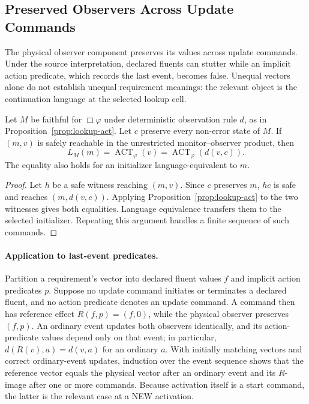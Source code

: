 \subsection{Preserved Observers Across Update Commands}
\label{ta:command-observation}
The physical observer component preserves its values across update commands. Under the source interpretation, declared fluents can stutter while an implicit action predicate, which records the last event, becomes false. Unequal vectors alone do not establish unequal requirement meanings: the relevant object is the continuation language at the selected lookup cell.

\begin{lemma}\label{lem:command-observation}
Let $M$ be faithful for $\Box\varphi$ under deterministic observation rule $d$, as in Proposition~\ref{prop:lookup-act}. Let $c$ preserve every non-error state of $M$. If $(m,v)$ is safely reachable in the unrestricted monitor--observer product, then
\[
 L_M(m)=\operatorname{ACT}_\varphi(v)
       =\operatorname{ACT}_\varphi(d(v,c)).
\]
The equality also holds for an initializer language-equivalent to $m$.
\end{lemma}
\begin{proof}
Let $h$ be a safe witness reaching $(m,v)$. Since $c$ preserves $m$, $hc$ is safe and reaches $(m,d(v,c))$. Applying Proposition~\ref{prop:lookup-act} to the two witnesses gives both equalities. Language equivalence transfers them to the selected initializer. Repeating this argument handles a finite sequence of such commands.
\end{proof}

\paragraph{Application to last-event predicates.}
Partition a requirement's vector into declared fluent values $f$ and implicit action predicates $p$. Suppose no update command initiates or terminates a declared fluent, and no action predicate denotes an update command. A command then has reference effect $R(f,p)=(f,0)$, while the physical observer preserves $(f,p)$. An ordinary event updates both observers identically, and its action-predicate values depend only on that event; in particular, $d(R(v),a)=d(v,a)$ for an ordinary $a$. With initially matching vectors and correct ordinary-event updates, induction over the event sequence shows that the reference vector equals the physical vector after an ordinary event and its $R$-image after one or more commands. Because activation itself is a start command, the latter is the relevant case at a NEW activation.

